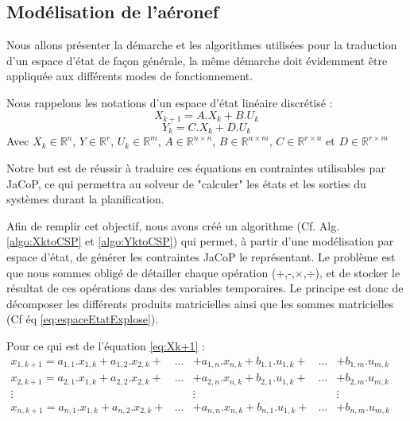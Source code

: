 \subsection{Modélisation de l'aéronef}
Nous allons présenter la démarche et les algorithmes utilisées pour la traduction d'un espace d'état de façon générale, la même démarche doit évidemment être appliquée aux différents modes de fonctionnement.

Nous rappelons les notations d'un espace d'état linéaire discrétisé :
\begin{equation}
\label{eq:Xk+1}
X_{k+1} = A.X_k + B.U_k
\end{equation}
\begin{equation}
\label{eq:Yk}
Y_k = C.X_k + D.U_k
\end{equation}
Avec $X_k \in \mathbb{R}^{n}$, $Y \in \mathbb{R}^{r}$, $U_k \in \mathbb{R}^{m}$, $A \in \mathbb{R}^{n\times n}$, $B \in \mathbb{R}^{n\times m}$, $C \in \mathbb{R}^{r\times n}$ et $D \in \mathbb{R}^{r\times m}$

Notre but est de réussir à traduire ces équations en contraintes utilisables par JaCoP, ce qui permettra au solveur de "calculer" les états et les sorties du systèmes durant la planification.

Afin de remplir cet objectif, nous avons créé un algorithme (Cf. Alg. \ref{algo:XktoCSP} et \ref{algo:YktoCSP}) qui permet, à partir d'une modélisation par espace d'état, de générer les contraintes JaCoP le représentant. Le problème est que nous sommes obligé de détailler chaque opération (+,-,$\times$,$\div$), et de stocker le résultat de ces opérations dans des variables temporaires. Le principe est donc de décomposer les différents produits matricielles ainsi que les sommes matricielles (Cf éq \ref{eq:espaceEtatExplose}). 

Pour ce qui est de l'équation \ref{eq:Xk+1} :\\
$
\begin{array}{ccccc}
x_{1,k+1} = a_{1,1}.x_{1,k} + a_{1,2}.x_{2,k} + &\dots& + a_{1,n}.x_{n,k} + b_{1,1}.u_{1,k} +&\dots&+ b_{1,m}.u_{m,k} \\ 
x_{2,k+1} = a_{2,1}.x_{1,k} + a_{2,2}.x_{2,k} + &\dots& + a_{2,n}.x_{n,k} + b_{2,1}.u_{1,k} +&\dots&+ b_{2,m}.u_{m,k} \\ 
\vdots&&\vdots&&\vdots\\ 
x_{n,k+1} = a_{n,1}.x_{1,k} + a_{n,2}.x_{2,k} + &\dots& + a_{n,n}.x_{n,k} + b_{n,1}.u_{1,k} +&\dots&+ b_{n,m}.u_{m,k}
\end{array} 
$

